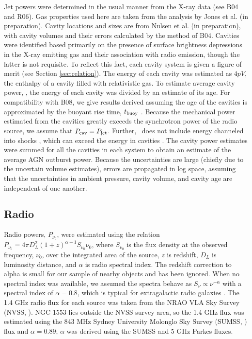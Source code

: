 \documentclass{emulateapj}
\begin{document}
Jet powers were determined in the usual manner from the X-ray data
(see B04 and R06). Gas properties used here are taken from the
analysis by Jones et al. (in preparation). Cavity locations and sizes
are from Nulsen et al. (in preparation), with cavity volumes and their
errors calculated by the method of B04. Cavities were identified based
primarily on the presence of surface brightness depressions in the
X-ray emitting gas and their association with radio emission, though
the latter is not requisite. To reflect this fact, each cavity system
is given a figure of merit (see Section \ref{sec:relation}). The
energy of each cavity was estimated as $4pV$, the enthalpy of a cavity
filled with relativistic gas. To estimate average cavity power, \pcav,
the energy of each cavity was divided by an estimate of its age. For
compatibility with B08, we give results derived assuming the age of
the cavities is approximated by the buoyant rise time, $t_{\rm{buoy}}$
\citep{2001ApJ...554..261C, 2003ApJ...592..839B}. Because the
mechanical power estimated from the cavities greatly exceeds the
synchrotron power of the radio source, we assume that $P_{\rm{cav}} =
P_{\rm{jet}}$. Further, \pcav\ does not include energy channeled into shocks
\citep[\eg][]{2007ApJ...665.1057F, 2009ApJ...707.1034B}, which can
exceed the energy in cavities \citep[\eg][]{herca}. The cavity power
estimates were summed for all the cavities in each system to obtain an
estimate of the average AGN outburst power. Because the uncertainties
are large (chiefly due to the uncertain volume estimates), errors are
propagated in log space, assuming that the uncertainties in ambient
pressure, cavity volume, and cavity age are independent of one
another.

\subsection{Radio}
\label{sec:radio}

Radio powers, $P_{\nu_0}$, were estimated using the relation
$P_{\nu_0} = 4 \pi D_L^2 (1+z)^{\alpha-1} S_{\nu_0} \nu_0$, where
$S_{\nu_0}$ is the flux density at the observed frequency, $\nu_0$,
over the integrated area of the source, $z$ is redshift, $D_L$ is
luminosity distance, and $\alpha$ is radio spectral index. The
redshift correction to alpha is small for our sample of nearby objects
and has been ignored. When no spectral index was available, we assumed
the spectra behave as $S_{\nu} \propto \nu^{-\alpha}$ with a spectral
index of $\alpha = 0.8$, which is typical for extragalactic radio
galaxies \citep{1992ARA&A..30..575C}. The 1.4 GHz radio flux for each
source was taken from the NRAO VLA Sky Survey (NVSS,
\citealt{nvss}). NGC 1553 lies outside the NVSS survey area, so the
1.4 GHz flux was estimated using the 843 MHz Sydney University
Molonglo Sky Survey (SUMSS, \citealt{sumss1}) flux and $\alpha =
0.89$; $\alpha$ was derived using the SUMSS and 5 GHz Parkes
\citep{1970ApL.....5...29W} fluxes.
\end{document}
